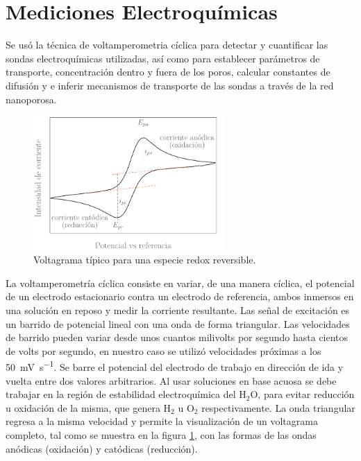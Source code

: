 \section{Mediciones Electroquímicas}\label{sec:medidas_eq}
	
	 Se usó la técnica de voltamperometria cíclica para detectar y cuantificar las sondas electroquímicas utilizadas, así como para establecer parámetros de transporte, concentración dentro y fuera de los poros, calcular constantes de difusión y e inferir mecanismos de transporte de las sondas a través de la red nanoporosa.\cite{Wi2000,Skoog1995,Gewirth2004} 


			\begin{figure}[ht]
			 		  \begin{center}
			 		  \includegraphics[width=0.65\textwidth]{Esquemas/CV_ideal.pdf}
			 		  \caption[Voltamperograma ideal]{Voltagrama típico para una especie redox reversible.}
			 		  \label{fig:CV_ideal}
			 		  \end{center}
			 		  \end{figure}

	 La voltamperometría cíclica consiste en variar, de una manera cíclica, el potencial de un electrodo estacionario contra un electrodo de referencia, ambos inmersos en una solución en reposo y medir la corriente resultante. Las señal de excitación es un barrido de potencial lineal con una onda de forma triangular. Las velocidades de barrido pueden variar desde unos cuantos milivolts por segundo hasta cientos de volts por segundo, en nuestro caso se utilizó velocidades próximas a los \SI{50}{\milli\volt.\second^{-1}}. Se barre el potencial del electrodo de trabajo en dirección de ida y vuelta entre dos valores arbitrarios. Al usar soluciones en base acuosa se debe trabajar en la región de estabilidad electroquímica del H$_2$O, para evitar reducción u oxidación de la misma, que genera H$_2$ u O$_2$ respectivamente. La onda triangular regresa a la misma velocidad y permite la visualización de un voltagrama completo, tal como se muestra en la figura \ref{fig:CV_ideal}, con las formas de las ondas anódicas (oxidación) y catódicas (reducción). 

